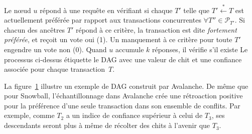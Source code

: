 Le nœud $u$ répond à une requête en vérifiant si chaque $T'$ telle que $T' \stackrel{*}{\gets} T$ est actuellement préférée par rapport aux transactions concurrentes $\forall T'' \in \mathcal{P}_{T'}$.
Si chacun des ancêtres $T'$ répond à ce critère, la transaction est dite \emph{fortement préférée}, et reçoit un vote oui (1). Un manquement à ce critère pour toute $T'$ engendre un vote non (0).
Quand $u$ accumule $k$ réponses, il vérifie s'il existe
Le processus ci-dessus étiquette le DAG avec une valeur de chit et une confiance associée pour chaque transaction~$T$.

\begin{figure}
\begin{center}
    
    \label{fig:dag-cd}
\end{center}
\end{figure}

La figure~\ref{fig:dag-cd} illustre un exemple de DAG construit par Avalanche.
De même que pour Snowball, l'échantillonnage dans Avalanche crée une rétroaction positive pour la préférence d'une seule transaction dans son ensemble de conflits.
Par exemple, comme $T_2$ a un indice de confiance supérieur à celui de $T_3$, ses descendants seront plus à même de récolter des chits à l'avenir que $T_3$.

